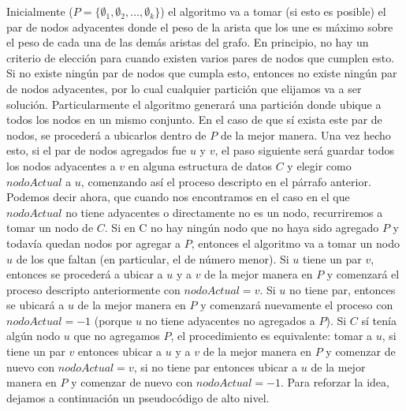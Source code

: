 \documentclass[a4paper]{article}
\begin{document}
\newline Inicialmente ($P = \{\emptyset_1, \emptyset_2, ..., \emptyset_k\}$) el algoritmo va a tomar (si esto es posible) el par de nodos adyacentes donde el peso de la arista que los une es máximo sobre el peso de cada una de las demás aristas del grafo. En principio, no hay un criterio de elección para cuando existen varios pares de nodos que cumplen esto. Si no existe ningún par de nodos que cumpla esto, entonces no existe ningún par de nodos adyacentes, por lo cual cualquier partición que elijamos va a ser solución. Particularmente el algoritmo generará una partición donde ubique a todos los nodos en un mismo conjunto. En el caso de que sí exista este par de nodos, se procederá a ubicarlos dentro de $P$ de la mejor manera. Una vez hecho esto, si el par de nodos agregados fue $u$ y $v$, el paso siguiente será guardar todos los nodos adyacentes a $v$ en alguna estructura de datos $C$ y elegir como $nodoActual$ a $u$, comenzando así el proceso descripto en el párrafo anterior. Podemos decir ahora, que cuando nos encontramos en el caso en el que $nodoActual$ no tiene adyacentes o directamente no es un nodo, recurriremos a tomar un nodo de $C$.
\newline Si en C no hay ningún nodo que no haya sido agregado $P$ y todavía quedan nodos por agregar a $P$, entonces el algoritmo va a tomar un nodo $u$ de los que faltan (en particular, el de número menor). Si $u$ tiene un par $v$, entonces se procederá a ubicar a $u$ y a $v$ de la mejor manera en $P$ y comenzará el proceso descripto anteriormente con $nodoActual = v$. Si $u$ no tiene par, entonces se ubicará a $u$ de la mejor manera en $P$ y comenzará nuevamente el proceso con $nodoActual = -1$ (porque $u$ no tiene adyacentes no agregados a $P$).
\newline Si $C$ sí tenía algún nodo $u$ que no agregamos $P$, el procedimiento es equivalente: tomar a $u$, si tiene un par $v$ entonces ubicar a $u$ y a $v$ de la mejor manera en $P$ y comenzar de nuevo con $nodoActual = v$, si no tiene par entonces ubicar a $u$ de la mejor manera en $P$ y comenzar de nuevo con $nodoActual = -1$.
\newline Para reforzar la idea, dejamos a continuación un pseudocódigo de alto nivel.
\newline
\end{document}
